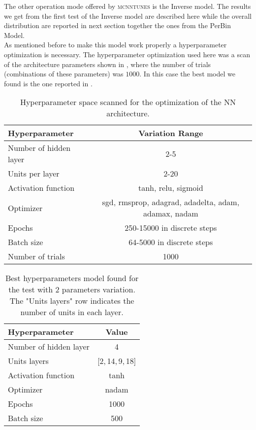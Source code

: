The other operation mode offered by \textsc{mcnntunes} is the Inverse model. 
The results we get from the first test of the Inverse model are described here while the overall distribution are reported in next section together the ones from the PerBin Model. 
\\
As mentioned before to make this model work properly a hyperparameter optimization is necessary. The hyperparameter optimization used here was a scan of the architecture parameters shown in , where the number of trials (combinations of these parameters) was $1000$. In this case the best model we found is the one reported in .
\begin{table}[!htb]
	\centering
	\begin{tabular}{| l | c |}
	\hline
	Hyperparameter & Variation Range\\[2pt]\hline
	Number of hidden layer & 2-5 \\[2pt]
	Units per layer & 2-20 \\[2pt]
	Activation function & tanh, relu, sigmoid \\[2pt]
	Optimizer & {\small sgd, rmsprop, adagrad, adadelta, adam, adamax, nadam}\\[2pt]
	Epochs & 250-15000 in discrete steps\\[2pt]
	Batch size & 64-5000 in discrete steps\\[2pt] \hline
	Number of trials & 1000\\[2pt]\hline
	\end{tabular}
	\caption{Hyperparameter space scanned for the optimization of the NN architecture.}
	\label{table:hyperpar_MinBias_2par}
\end{table}


\begin{table}[!htb]
	\centering
	\begin{tabular}{ l | c }
	Hyperparameter & Value\\[2pt]\hline\hline
	Number of hidden layer & 4 \\[2pt]
	Units layers & [2,\,14,\,9,\,18] \\[2pt]
	Activation function & tanh \\[2pt]
	Optimizer & nadam\\[2pt]
	Epochs & 1000\\[2pt]
	Batch size & 500\\[2pt]
	\end{tabular}
	\caption{Best hyperparameters model found for the test with 2 parameters variation. The "Units layers" row indicates the number of units in each layer.}
	\label{table:hyperpar_2parTEST}
\end{table}

